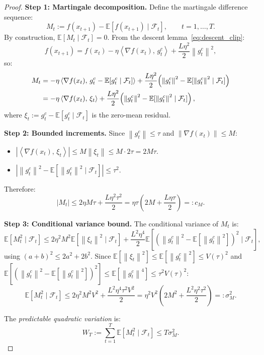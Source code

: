 \documentclass[11pt]{article}
\theoremstyle{definition}
\newcommand{\E}{\mathbb{E}}
\newcommand{\norm}[1]{\left\| #1 \right\|}
\newcommand{\abs}[1]{\left| #1 \right|}
\newcommand{\inner}[2]{\left\langle #1,\, #2 \right\rangle}
\newcommand{\Filt}{\mathcal{F}}
\begin{document}
\begin{proof}
\textbf{Step 1: Martingale decomposition.}
Define the martingale difference sequence:
\[
  M_t := f(x_{t+1}) - \E[f(x_{t+1}) \mid \Filt_t], \qquad t = 1, \ldots, T.
\]
By construction, $\E[M_t \mid \Filt_t] = 0$. From the descent
lemma~\eqref{eq:descent_clip}:
\[
  f(x_{t+1}) = f(x_t) - \eta\inner{\nabla f(x_t)}{g_t^c}
    + \frac{L\eta^2}{2}\norm{g_t^c}^2,
\]
so:
\begin{align}
  M_t &= -\eta\inner{\nabla f(x_t)}{g_t^c - \E[g_t^c \mid \Filt_t]}
    + \frac{L\eta^2}{2}\!\left(\norm{g_t^c}^2
      - \E[\norm{g_t^c}^2 \mid \Filt_t]\right) \notag\\
  &= -\eta\inner{\nabla f(x_t)}{\xi_t}
    + \frac{L\eta^2}{2}\!\left(\norm{g_t^c}^2 - \E[\norm{g_t^c}^2 \mid \Filt_t]\right),
    \label{eq:M_decomp}
\end{align}
where $\xi_t := g_t^c - \E[g_t^c \mid \Filt_t]$ is the zero-mean residual.

\textbf{Step 2: Bounded increments.}
Since $\norm{g_t^c} \leq \tau$ and $\norm{\nabla f(x_t)} \leq M$:
\begin{itemize}[noitemsep]
  \item $\abs{\inner{\nabla f(x_t)}{\xi_t}} \leq M\norm{\xi_t}
    \leq M \cdot 2\tau = 2M\tau$.
  \item $\abs{\norm{g_t^c}^2 - \E[\norm{g_t^c}^2 \mid \Filt_t]} \leq \tau^2$.
\end{itemize}
Therefore:
\begin{equation}\label{eq:M_bound}
  \abs{M_t} \leq 2\eta M\tau + \frac{L\eta^2\tau^2}{2}
  = \eta\tau\!\left(2M + \frac{L\eta\tau}{2}\right) =: c_M.
\end{equation}

\textbf{Step 3: Conditional variance bound.}
The conditional variance of $M_t$ is:
\[
  \E[M_t^2 \mid \Filt_t]
  \leq 2\eta^2 M^2 \E[\norm{\xi_t}^2 \mid \Filt_t]
    + \frac{L^2\eta^4}{2}\E\!\left[\!\left(\norm{g_t^c}^2
      - \E[\norm{g_t^c}^2]\right)^{\!2} \mid \Filt_t\right],
\]
using $(a + b)^2 \leq 2a^2 + 2b^2$.
Since $\E[\norm{\xi_t}^2] \leq \E[\norm{g_t^c}^2] \leq V(\tau)^2$ and
$\E[(\norm{g_t^c}^2 - \E[\norm{g_t^c}^2])^2] \leq \E[\norm{g_t^c}^4]
\leq \tau^2 V(\tau)^2$:
\begin{equation}\label{eq:cond_var}
  \E[M_t^2 \mid \Filt_t]
  \leq 2\eta^2 M^2 V^2 + \frac{L^2\eta^4\tau^2 V^2}{2}
  = \eta^2 V^2\!\left(2M^2 + \frac{L^2\eta^2\tau^2}{2}\right)
  =: \sigma_M^2.
\end{equation}

The \emph{predictable quadratic variation} is:
\[
  W_T := \sum_{t=1}^T \E[M_t^2 \mid \Filt_t] \leq T\sigma_M^2.
\]


\end{proof}
\end{document}
